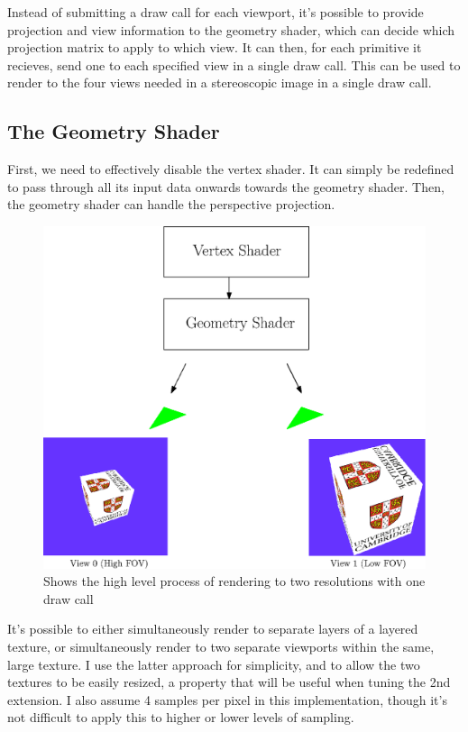 \documentclass[12pt,a4paper,twoside,openright]{report}
\begin{document}
Instead of submitting a draw call for each viewport, it's possible to provide projection and view information to the geometry shader, which can decide which projection matrix to apply to which view. It can then, for each primitive it recieves, send one to each specified view in a single draw call. This can be used to render to the four views needed in a stereoscopic image in a single draw call.

\subsection{The Geometry Shader}

First, we need to effectively disable the vertex shader. It can simply be redefined to pass through all its input data onwards towards the geometry shader.
Then, the geometry shader can handle the perspective projection.

\begin{figure}[tbh]
\centerline{\includegraphics[scale=0.6]{figs/geoshader.eps}}
\caption{Shows the high level process of rendering to two resolutions with one draw call}
\label{epsfig1}
\end{figure}

It's possible to either simultaneously render to separate layers of a layered texture, or simultaneously render to two separate viewports within the same, large texture. I use the latter approach for simplicity, and to allow the two textures to be easily resized, a property that will be useful when tuning the 2nd extension. I also assume 4 samples per pixel in this implementation, though it's not difficult to apply this to higher or lower levels of sampling. 
\end{document}
